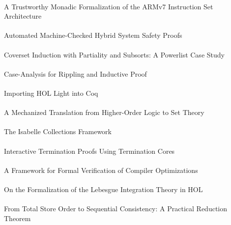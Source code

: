 \documentclass{article}
\begin{document}
\cite{10-fox-armv7} \\
A Trustworthy Monadic Formalization of the {ARMv7} Instruction Set Architecture \\

\cite{10-geuvers-safety} \\
Automated Machine-Checked Hybrid System Safety Proofs \\

\cite{10-hendrix-coverset} \\
Coverset Induction with Partiality and Subsorts: A Powerlist Case Study \\

\cite{10-johansson-rippling} \\
Case-Analysis for Rippling and Inductive Proof \\

\cite{10-keller-importing} \\
Importing {HOL Light} into {Coq} \\

\cite{10-krauss-translation} \\
A Mechanized Translation from Higher-Order Logic to Set Theory \\

\cite{10-lammich-collections} \\
The {Isabelle} Collections Framework \\

\cite{10-manolios-termination} \\
Interactive Termination Proofs Using Termination Cores \\

\cite{10-mansky-optimizations} \\
A Framework for Formal Verification of Compiler Optimizations \\

\cite{10-mhamdi-integration} \\
On the Formalization of the {Lebesgue} Integration Theory in {HOL} \\

\cite{10-cohen-reduction} \\
From Total Store Order to Sequential Consistency: A Practical Reduction Theorem \\
\end{document}
